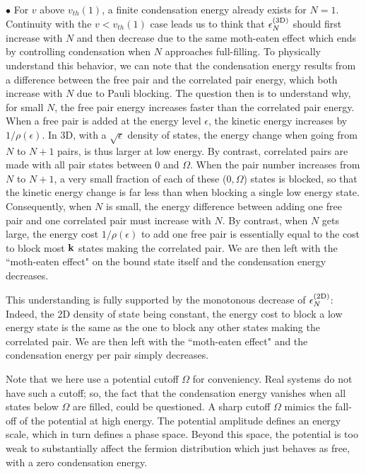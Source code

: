 \documentclass[5p,twocolumn]{elsarticle}
\begin{document}
$\bullet$  For $v$ above $v_{th}(1)$, a finite condensation energy already exists for $N=1$. Continuity with the $v<v_{th}(1)$ case leads us to think that $\epsilon^{{\text{(3D)}}}_N$ should first increase with $N$ and then decrease due to the same moth-eaten effect which ends by controlling condensation when $N$ approaches full-filling. 
To physically understand this behavior, we can note that the condensation energy results from a difference between the free pair and the correlated pair energy, which both increase with $N$ due to Pauli blocking.  The question then is to understand why, for small $N$, the free pair energy increases faster than the correlated pair energy. When a free pair is added at the energy level $\epsilon$, the kinetic energy increases by $1/\rho(\epsilon)$.  In 3D, with a $\sqrt{\epsilon}$ density of states, the energy change when going from $N$ to $N+1$ pairs, is thus larger at low energy. By contrast, correlated pairs are made with all pair states between $0$ and $\Omega$. When the pair number increases from $N$ to $N+1$, a very small fraction of each of these ($0,\Omega$) states is blocked, so that the kinetic energy change is far less than when blocking a single low energy state.  Consequently, when $N$ is small,  the energy difference between adding one free pair and one correlated pair must increase with $N$. By contrast, when $N$ gets large, the energy cost $1/\rho(\epsilon)$ to add one free pair is essentially equal to the cost to block most $\mathbf{k}$ states making the correlated pair.  We are then left with the ``moth-eaten effect" on the bound state itself and the condensation energy decreases. 

This understanding is fully supported by the monotonous decrease of $\epsilon^{{\text{(2D)}}}_N$: Indeed, the 2D density of state being constant, the energy cost to block a low energy state is the same as the one to block  any other states making the correlated pair. We are then left with the ``moth-eaten effect" and the condensation energy per pair simply decreases.

Note that we here use a potential cutoff $\Omega$ for conveniency.  Real systems do not have such a cutoff; so,   the fact that the condensation energy vanishes when all states below $\Omega$ are filled, could be questioned.  A sharp cutoff $\Omega$ mimics the fall-off of the potential at high energy.  The potential amplitude defines an energy scale, which in turn defines a phase space.  Beyond this space, the potential is too weak to substantially affect the fermion distribution which just behaves as free, with a zero condensation energy. 
\end{document}

